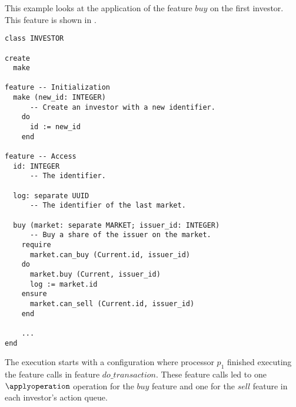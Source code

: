 \begin{fortechnicalreport}
\newpage
\begin{example}
This example looks at the application of the feature $buy$ on the first investor. This feature is shown in .

\begin{lstlisting}[caption=Investor class, label=lst:investor class, language=SCOOP]
class INVESTOR

create
  make
	
feature -- Initialization
  make (new_id: INTEGER)
      -- Create an investor with a new identifier.
    do
      id := new_id
    end
		
feature -- Access
  id: INTEGER
      -- The identifier.
	
  log: separate UUID
      -- The identifier of the last market.

  buy (market: separate MARKET; issuer_id: INTEGER)
      -- Buy a share of the issuer on the market.
    require
      market.can_buy (Current.id, issuer_id)
    do
      market.buy (Current, issuer_id)
      log := market.id
    ensure
      market.can_sell (Current.id, issuer_id)
    end

    ...		
end
\end{lstlisting}

The execution starts with a configuration where processor $p_{1}$ finished executing the feature calls in feature $do\_transaction$. These feature calls led to one $\applyoperation$ operation for the $buy$ feature and one for the $sell$ feature in each investor's action queue.


\end{example}
\end{fortechnicalreport}
